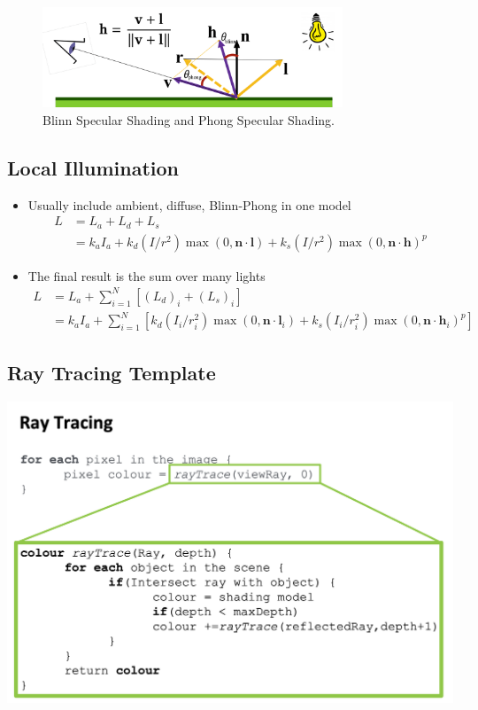 \documentclass[11pt]{article}
\begin{document}
\begin{figure}
	\centering\includegraphics[width=0.8\textwidth]{figs/blinn}
	\caption{\label{blinn} Blinn Specular Shading and Phong Specular Shading.}
\end{figure}

\subsection{Local Illumination}
\begin{itemize}
	\item Usually include ambient, diffuse, Blinn-Phong in one model
	\begin{equation}
		\begin{aligned}
			L &=L_{a}+L_{d}+L_{s} \\
			&=k_{a} I_{a}+k_{d}\left(I / r^{2}\right) \max (0, \mathbf{n} \cdot \mathbf{l})+k_{s}\left(I / r^{2}\right) \max (0, \mathbf{n} \cdot \mathbf{h})^{p}
		\end{aligned}
	\end{equation}
	\item The final result is the sum over many lights
	\begin{align}
		L
		&= L_{a}+\sum_{i=1}^{N}\left[\left(L_{d}\right)_{i}+\left(L_{s}\right)_{i}\right] \\
		&=k_{a} I_{a}+\sum_{i=1}^{N}\left[k_{d}\left(I_{i} / r_{i}^{2}\right) \max \left(0, \mathbf{n} \cdot \mathbf{l}_{i}\right)+
		k_{s}\left(I_{i} / r_{i}^{2}\right) \max \left(0, \mathbf{n} \cdot \mathbf{h}_{i}\right)^{p}\right]
	\end{align}
\end{itemize}

\subsection{Ray Tracing Template}
{\center \includegraphics[width=1.0\textwidth]{figs/ray trace}}
\end{document}
